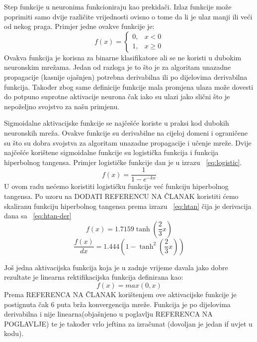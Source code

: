 \documentclass[times, utf8, zavrsni]{fer}
\begin{document}
Step funkcije u neuronima funkcioniraju kao prekidači. Izlaz funkcije može poprimiti samo dvije različite vrijednosti ovisno o tome da li je ulaz manji ili veći od nekog praga. Primjer jedne ovakve funkcije je:
\begin{equation}
  f(x) = \begin{cases}
    0, & \text{$x<0$}\\
    1, & \text{$x\geq0$}
  \end{cases}
\end{equation}
Ovakva funkcija je korisna za binarne klasifikatore ali se ne koristi u dubokim neuronskim mrežama. Jedan od razloga je to što je za algoritam unazadne propagacije (kasnije ojašnjen) potrebna derivabilna ili po dijelovima derivabilna funkcija. Također zbog same definicije funkcije mala promjena ulaza može dovesti do potpuno suprotne aktivacije neurona čak iako su ulazi jako slični što je nepoželjno svojstvo za našu primjenu.

Sigmoidalne aktivacijske funkcije se najčešće koriste u praksi kod dubokih neuronskih mreža. Ovakve funkcije su derivabilne na cijeloj domeni i ograničene su što su dobra svojstva za algoritam unazadne propagacije i učenje mreže. Dvije najčešće korištene sigmoidalne funkcije su logistička funkcija i funkcija hiperbolnog tangensa. Primjer logističke funkcije dan je u izrazu ~\ref{eq:logistic}. 
\begin{equation}\label{eq:logistic}
f(x) = \frac{1}{1-e^{-kx}}
\end{equation}
U ovom radu nećemo koristiti logističku funkcije već funkciju hiperbolnog tangensa. Po uzoru na DODATI REFERENCU NA ČLANAK koristiti ćemo skaliranu funkciju hiperbolnog tangensa prema izrazu ~\ref{eq:htan} čija je derivacija dana sa ~\ref{eq:htan-der}
\begin{equation}\label{eq:htan}
f(x) = 1.7159\tanh\left(\frac{2}{3}x\right)
\end{equation}
\begin{equation}\label{eq:htan-der}
\dfrac{f(x)}{dx} = 1.444\left(1-\tanh^2\left(\frac{2}{3}x\right)\right)
\end{equation}

Još jedna aktivacijska funkcija koja je u zadnje vrijeme davala jako dobre rezultate je linearna rektifikacijska funkcija definirana kao:
\begin{equation}\label{eq:htan}
f(x) = max(0, x)
\end{equation}
Prema REFERENCA NA ČLANAK korištenjem ove aktivacijske funkcije je postignuta čak 6 puta brža konvergencija mreže. Funkcija je po dijelovima derivabilna i nije linearna(objašnjeno u poglavlju REFERENCA NA POGLAVLJE) te je također vrlo jeftina za izračunat (dovoljan je jedan if uvjet u kodu).
\end{document}
